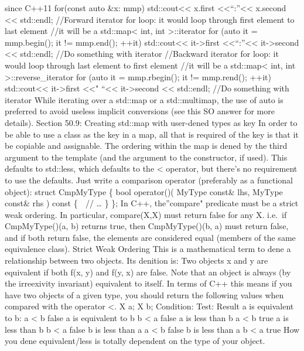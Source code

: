 since C++11 for(const auto \&x: mmp) std::cout\textless\textless{}
x.first \textless\textless{}``:''\textless\textless{} x.second
\textless\textless{} std::endl; //Forward iterator for loop: it would
loop through first element to last element //it will be a
std::map\textless{} int, int \textgreater::iterator for (auto it =
mmp.begin(); it != mmp.end(); ++it) std::cout\textless\textless{}
it-\textgreater first \textless\textless{}``:''\textless\textless{}
it-\textgreater second \textless\textless{} std::endl; //Do something
with iterator //Backward iterator for loop: it would loop through last
element to first element //it will be a std::map\textless{} int, int
\textgreater::reverse\_iterator for (auto it = mmp.rbegin(); it !=
mmp.rend(); ++it) std::cout\textless\textless{} it-\textgreater first
\textless\textless" ``\textless\textless{} it-\textgreater second
\textless\textless{} std::endl; //Do something with iterator While
iterating over a std::map or a std::multimap, the use of auto is
preferred to avoid useless implicit conversions (see this SO answer for
more details). Section 50.9: Creating std::map with user-dened types as
key In order to be able to use a class as the key in a map, all that is
required of the key is that it be copiable and assignable. The ordering
within the map is dened by the third argument to the template (and the
argument to the constructor, if used). This defaults to std::less, which
defaults to the \textless{} operator, but there's no requirement to use
the defaults. Just write a comparison operator (preferably as a
functional object): struct CmpMyType \{ bool operator()( MyType const\&
lhs, MyType const\& rhs ) const \{  // \ldots{} \} \}; In C++,
the''compare" predicate must be a strict weak ordering. In particular,
compare(X,X) must return false for any X. i.e.~if CmpMyType()(a, b)
returns true, then CmpMyType()(b, a) must return false, and if both
return false, the elements are considered equal (members of the same
equivalence class). Strict Weak Ordering This is a mathematical term to
dene a relationship between two objects. Its denition is: Two objects x
and y are equivalent if both f(x, y) and f(y, x) are false. Note that an
object is always (by the irreexivity invariant) equivalent to itself. In
terms of C++ this means if you have two objects of a given type, you
should return the following values when compared with the operator
\textless. X a; X b; Condition: Test: Result a is equivalent to b: a
\textless{} b false a is equivalent to b b \textless{} a false a is less
than b a \textless{} b true a is less than b b \textless{} a false b is
less than a a \textless{} b false b is less than a b \textless{} a true
How you dene equivalent/less is totally dependent on the type of your
object.

